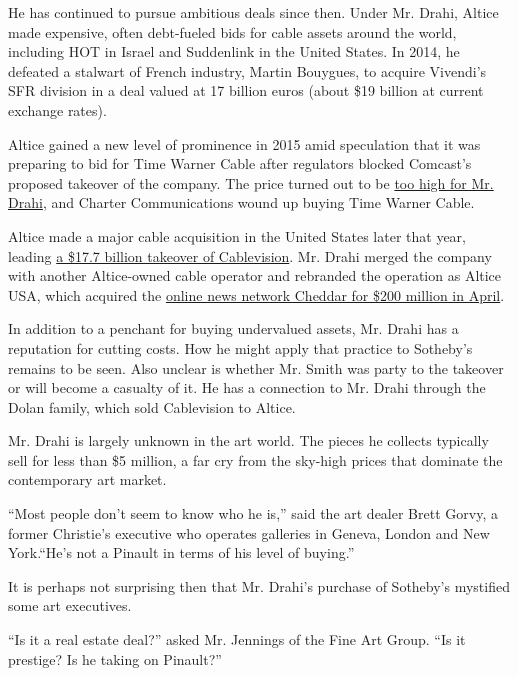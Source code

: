 He has continued to pursue ambitious deals since then. Under Mr. Drahi,
Altice made expensive, often debt-fueled bids for cable assets around
the world, including HOT in Israel and Suddenlink in the United States.
In 2014, he defeated a stalwart of French industry, Martin Bouygues, to
acquire Vivendi's SFR division in a deal valued at 17 billion euros
(about \$19 billion at current exchange rates).

Altice gained a new level of prominence in 2015 amid speculation that it
was preparing to bid for Time Warner Cable after regulators blocked
Comcast's proposed takeover of the company. The price turned out to be
\href{https://www.wsj.com/articles/altice-not-ready-for-twc-merger-1432719685?dlbk}{too
high for Mr. Drahi}, and Charter Communications wound up buying Time
Warner Cable.

Altice made a major cable acquisition in the United States later that
year, leading
\href{https://www.nytimes3xbfgragh.onion/2015/09/17/business/international/altice-in-deal-to-take-over-cablevision.html?dlbk}{a
\$17.7 billion takeover of Cablevision}. Mr. Drahi merged the company
with another Altice-owned cable operator and rebranded the operation as
Altice USA, which acquired the
\href{https://www.businesswire.com/news/home/20190430005885/en/Altice-USA-Acquire-Cheddar?dlbk}{online
news network Cheddar for \$200 million in April}.

In addition to a penchant for buying undervalued assets, Mr. Drahi has a
reputation for cutting costs. How he might apply that practice to
Sotheby's remains to be seen. Also unclear is whether Mr. Smith was
party to the takeover or will become a casualty of it. He has a
connection to Mr. Drahi through the Dolan family, which sold Cablevision
to Altice.

Mr. Drahi is largely unknown in the art world. The pieces he collects
typically sell for less than \$5 million, a far cry from the sky-high
prices that dominate the contemporary art market.

``Most people don't seem to know who he is,'' said the art dealer Brett
Gorvy, a former Christie's executive who operates galleries in Geneva,
London and New York.``He's not a Pinault in terms of his level of
buying.''

It is perhaps not surprising then that Mr. Drahi's purchase of Sotheby's
mystified some art executives.

``Is it a real estate deal?'' asked Mr. Jennings of the Fine Art Group.
``Is it prestige? Is he taking on Pinault?''

